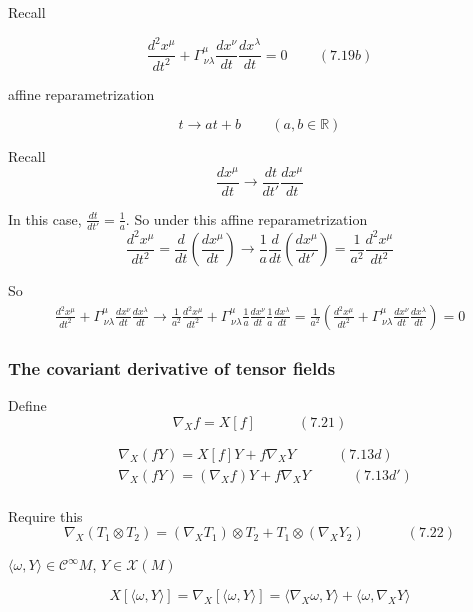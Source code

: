 \documentclass[twoside]{amsart}
\begin{document}
Recall

\[
\frac{d^2 x^{\mu} }{dt^2} + \Gamma^{\mu}_{ \, \nu \lambda} \frac{dx^{\nu}}{ dt} \frac{dx^{\lambda}}{ dt} = 0 \quad \quad \, (7.19b)
\]

affine reparametrization

\[
t\to at +b \quad \quad \, (a,b \in \mathbb{R})
\]

Recall 
\[
\frac{dx^{\mu}}{dt} \to \frac{dt}{dt'} \frac{dx^{\mu} }{dt}
\]

In this case, $\frac{dt}{dt'} = \frac{1}{a}$.  So under this affine reparametrization
\[
\frac{d^2 x^{\mu}}{dt^2} = \frac{d}{dt} \left( \frac{dx^{\mu}}{dt} \right) \to \frac{1}{a} \frac{d}{dt} \left( \frac{dx^{\mu} }{ dt'} \right) = \frac{1}{a^2} \frac{d^2 x^{\mu} }{dt^2}
\]

So
\[
\begin{gathered}
  \frac{d^2 x^{\mu}}{dt^2} + \Gamma^{\mu}_{ \, \nu \lambda} \frac{dx^{\nu} }{dt} \frac{dx^{\lambda}}{dt} \to   \frac{1}{a^2} \frac{d^2 x^{\mu}}{dt^2} + \Gamma^{\mu}_{ \, \nu \lambda} \frac{1}{a} \frac{dx^{\nu} }{dt} \frac{1}{a} \frac{dx^{\lambda}}{dt} = \frac{1}{a^2} \left( \frac{d^2 x^{\mu} }{ dt^2} + \Gamma^{\mu }_{ \, \nu \lambda} \frac{dx^{\nu }}{dt} \frac{dx^{\lambda} }{dt} \right) = 0 
\end{gathered}
\]

\subsubsection{ The covariant derivative of tensor fields }

Define 
\[
\nabla_X f = X[f] \quad \quad \quad (7.21)
\]

\[
\begin{aligned}
  & \nabla_X (fY) = X[f] Y + f\nabla_X Y \quad \quad \quad (7.13d) \\ 
  & \nabla_X (fY) = (\nabla_X f) Y + f\nabla_X Y \quad \quad \quad (7.13d') \\ 
\end{aligned}
\]

Require this 
\begin{equation}
  \nabla_X (T_1 \otimes T_2 ) = (\nabla_X T_1) \otimes T_2 + T_1 \otimes (\nabla_X Y_2) \quad \quad \quad (7.22)
\end{equation}

$\langle \omega, Y \rangle \in \mathcal{C}^{\infty}M$, $Y \in \mathcal{X}(M)$

\[
X[\langle \omega, Y \rangle ] = \nabla_X[ \langle \omega, Y \rangle ] = \langle \nabla_X \omega, Y \rangle + \langle \omega, \nabla_X Y \rangle
\]
\end{document}
